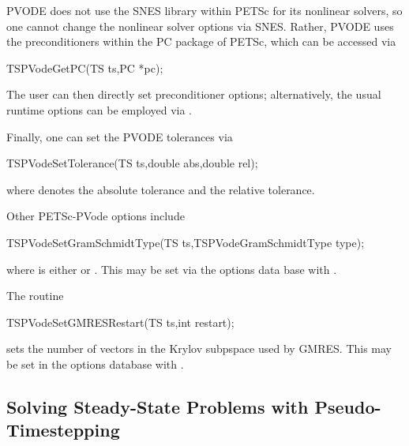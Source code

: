 PVODE does not use the SNES library within PETSc for its nonlinear
solvers, so one cannot change the nonlinear solver options via
SNES. Rather, PVODE uses the preconditioners within the PC package
of PETSc, which can be accessed via
\begin{tabbing}
 TSPVodeGetPC(TS ts,PC *pc);
\end{tabbing}
The user can then directly set preconditioner options; 
alternatively, the usual runtime options can be employed
via . 

Finally, one can set the PVODE tolerances via
\begin{tabbing}
 TSPVodeSetTolerance(TS ts,double abs,double rel);
\end{tabbing}
where  denotes the absolute tolerance and 
the relative tolerance. 

Other PETSc-PVode options include
\begin{tabbing}
  TSPVodeSetGramSchmidtType(TS ts,TSPVodeGramSchmidtType type);
\end{tabbing}
where  is either  or 
. 
 
 This may be set via the options data base
with .

The routine 
\begin{tabbing}
  TSPVodeSetGMRESRestart(TS ts,int restart);
\end{tabbing}
sets the number of vectors in the Krylov subpspace used by GMRES.
 This may be set in the options 
database with  . 


\subsection{Solving Steady-State Problems with Pseudo-Timestepping}

